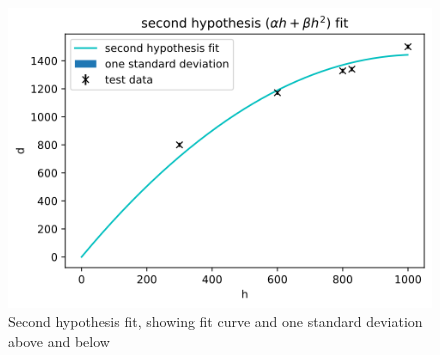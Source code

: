 \documentclass[a4paper]{article}
\begin{document}
\begin{figure}[htb!]
\centerline{\includegraphics[scale=0.7]{h2.png}}
\caption{Second hypothesis fit, showing fit curve and one standard deviation above and below}
\label{fig:fit2}
\end{figure}
\end{document}
